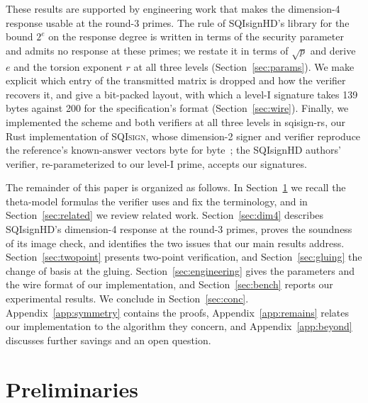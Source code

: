 \documentclass[version=preprint]{iacrcc}
\newif\ifanon
\newcommand{\SQIsign}{SQI{\textsc{sign}}}
\begin{document}
    These results are supported by engineering work that makes the
    dimension-4 response usable at the round-3 primes. The rule of SQIsignHD's library for
    the bound $2^e$ on the response degree is written in terms of the security
    parameter and admits no response at these primes; we restate it in terms
    of $\sqrt{p}$ and derive $e$ and the torsion exponent $r$ at all three
    levels (Section~\ref{sec:params}). We make explicit which entry of the
    transmitted matrix is dropped and how the verifier recovers it, and give a
    bit-packed layout, with which a level-I signature takes 139 bytes against
    200 for the specification's format (Section~\ref{sec:wire}). Finally, we
    implemented the scheme and both verifiers at all three levels in
    \ifanon our Rust implementation of {\SQIsign}, whose dimension-2 signer
    and verifier reproduce the reference's known-answer vectors byte for
    byte, and which we provide as supplementary material for the
    review; \else sqisign-rs, our Rust implementation of {\SQIsign}, whose
    dimension-2 signer and verifier reproduce the reference's known-answer
    vectors byte for byte~\cite{Ray26c}; \fi the SQIsignHD authors' verifier, re-parameterized to our
    level-I prime, accepts our signatures.

    The remainder of this paper is organized as follows. In
    Section~\ref{sec:terms} we recall the theta-model formulas the verifier uses and fix the terminology, and in
    Section~\ref{sec:related} we review related work. Section~\ref{sec:dim4}
    describes SQIsignHD's dimension-4 response at the round-3 primes,
    proves the soundness of its image check, and identifies the two issues
    that our main results address.
    Section~\ref{sec:twopoint} presents two-point verification, and
    Section~\ref{sec:gluing} the change of basis at the gluing.
    Section~\ref{sec:engineering} gives the parameters and the wire format of
    our implementation, and Section~\ref{sec:bench} reports our experimental
    results. We conclude in
    Section~\ref{sec:conc}. Appendix~\ref{app:symmetry} contains the proofs,
    Appendix~\ref{app:remains} relates our implementation to the algorithm
    they concern, and
    Appendix~\ref{app:beyond} discusses further savings and an open question.

    \section{Preliminaries}
    \label{sec:terms}
\end{document}
